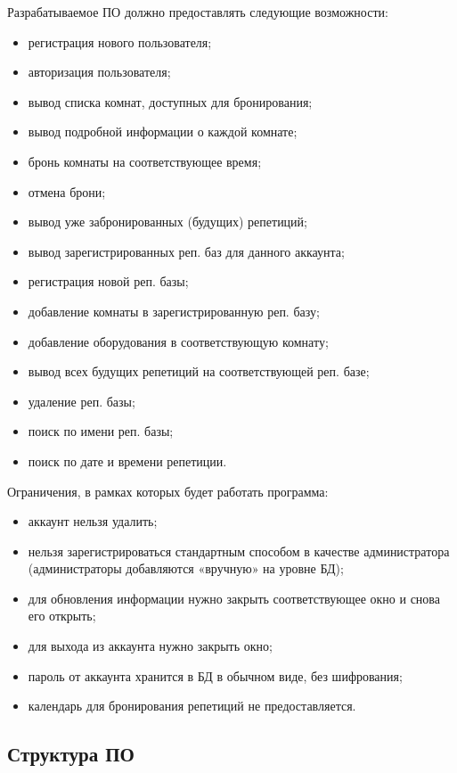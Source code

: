 Разрабатываемое ПО должно предоставлять следующие возможности:
\begin{itemize}
	\item регистрация нового пользователя;
	\item авторизация пользователя;
	\item вывод списка комнат, доступных для бронирования;
	\item вывод подробной информации о каждой комнате;
	\item бронь комнаты на соответствующее время;
	\item отмена брони;
	\item вывод уже забронированных (будущих) репетиций;
	\item вывод зарегистрированных реп. баз для данного аккаунта;
	\item регистрация новой реп. базы;
	\item добавление комнаты в зарегистрированную реп. базу;
	\item добавление оборудования в соответствующую комнату;
	\item вывод всех будущих репетиций на соответствующей реп. базе;
	\item удаление реп. базы;
	\item поиск по имени реп. базы;
	\item поиск по дате и времени репетиции.
\end{itemize}

Ограничения, в рамках которых будет работать программа:
\begin{itemize}
	\item аккаунт нельзя удалить;
	\item нельзя зарегистрироваться стандартным способом в качестве администратора (администраторы добавляются «вручную» на уровне БД);
	\item для обновления информации нужно закрыть соответствующее окно и снова его открыть;
	\item для выхода из аккаунта нужно закрыть окно;
	\item пароль от аккаунта хранится в БД в обычном виде, без шифрования;
	\item календарь для бронирования репетиций не предоставляется.
\end{itemize}

\subsection{Структура ПО}

